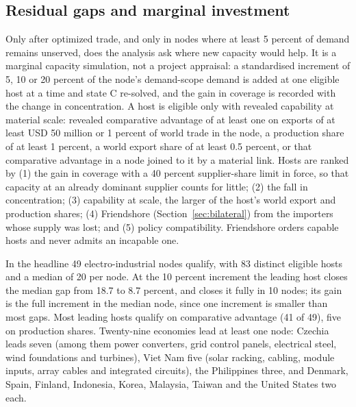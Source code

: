 \subsection{Residual gaps and marginal investment}
\label{subsec:aib_investment}

Only after optimized trade, and only in nodes where at least 5 percent of demand remains unserved,
does the analysis ask where new capacity would help. It is a marginal capacity simulation, not a
project appraisal: a standardised increment of 5, 10 or 20 percent of the node's demand-scope demand
is added at one eligible host at a time and state C re-solved, and the gain in coverage is recorded
with the change in concentration. A host is eligible only with revealed capability at material scale:
revealed comparative advantage of at least one on exports of at least USD 50 million or 1 percent of
world trade in the node, a production share of at least 1 percent, a world export share of at least
0.5 percent, or that comparative advantage in a node joined to it by a material link. Hosts are ranked
by (1) the gain in coverage with a 40 percent supplier-share limit in force, so that capacity at an
already dominant supplier counts for little; (2) the fall in concentration; (3) capability at scale,
the larger of the host's world export and production shares; (4) Friendshore
(Section~\ref{sec:bilateral}) from the importers whose supply was lost; and (5) policy compatibility.
Friendshore orders capable hosts and never admits an incapable one.

In the headline 49 electro-industrial nodes qualify, with 83 distinct eligible hosts and a median of
20 per node. At the 10 percent increment the leading host closes the median gap from 18.7 to 8.7
percent, and closes it fully in 10 nodes; its gain is the full increment in the median node, since one
increment is smaller than most gaps. Most leading hosts qualify on comparative advantage (41 of 49),
five on production shares. Twenty-nine economies lead at least one node: Czechia leads seven (among them
power converters, grid control panels, electrical steel, wind foundations and turbines), Viet Nam five
(solar racking, cabling, module inputs, array cables and integrated circuits), the Philippines three, and
Denmark, Spain, Finland, Indonesia, Korea, Malaysia, Taiwan and the United States two each.

